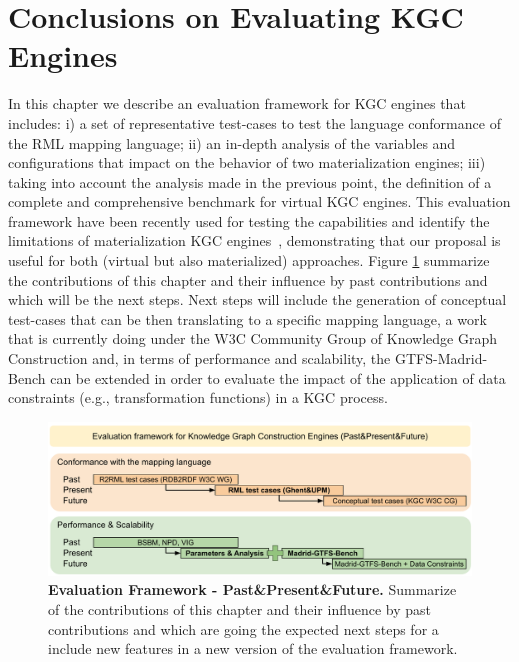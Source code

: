 \section{Conclusions on Evaluating KGC Engines}
In this chapter we describe an evaluation framework for KGC engines that includes: i) a set of representative test-cases to test the language conformance of the RML mapping language; ii) an in-depth analysis of the variables and configurations that impact on the behavior of two materialization engines; iii) taking into account the analysis made in the previous point, the definition of a complete and comprehensive benchmark for virtual KGC engines. This evaluation framework have been recently used for testing the capabilities and identify the limitations of materialization KGC engines~\citep{arenas2021knowledge}, demonstrating that our proposal is useful for both (virtual but also materialized) approaches. Figure \ref{fig:eval-framework} summarize the contributions of this chapter and their influence by past contributions and which will be the next steps. Next steps will include the generation of conceptual test-cases that can be then translating to a specific mapping language, a work that is currently doing under the W3C Community Group of Knowledge Graph Construction and, in terms of performance and scalability, the GTFS-Madrid-Bench can be extended in order to evaluate the impact of the application of data constraints (e.g., transformation functions) in a KGC process.

\begin{figure}
    \centering
    \includegraphics[angle=90,width=0.5\linewidth]{figures/Evaluation Framework.pdf}
    \caption[Evaluation Framework - Past\&Present\&Future]{\textbf{Evaluation Framework - Past\&Present\&Future.} Summarize of the contributions of this chapter and their influence by past contributions and which are going the expected next steps for a include new features in a new version of the evaluation framework.}
    \label{fig:eval-framework}
\end{figure}